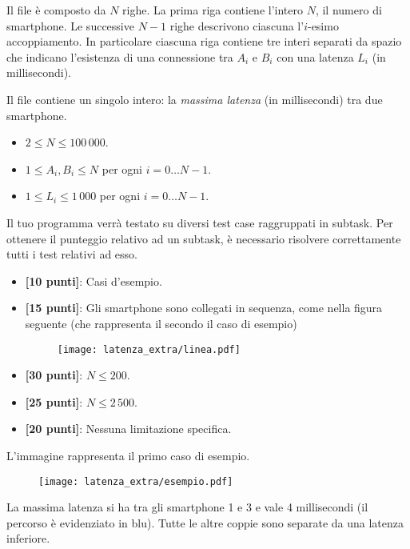 \InputFile
Il file  è composto da $N$ righe. La prima riga contiene l'intero $N$, il numero di smartphone.
Le successive $N - 1$ righe descrivono ciascuna l'$i$-esimo accoppiamento. In particolare ciascuna riga contiene tre interi separati da spazio che indicano l'esistenza di una connessione tra $A_i$ e $B_i$ con una latenza $L_i$ (in millisecondi).

\OutputFile
Il file \outputfile{} contiene un singolo intero: la \emph{massima latenza} (in millisecondi) tra due smartphone.

\Constraints
\begin{itemize}[nolistsep, itemsep=2mm]
    \item $2 \le N \le 100\,000$.
    \item $1 \le A_i, B_i \le N$ per ogni $i=0\ldots N-1$.
    \item $1 \le L_i \le 1\,000$ per ogni $i=0\ldots N-1$.
\end{itemize}

\pagebreak
\Scoring
Il tuo programma verrà testato su diversi test case raggruppati in subtask.
Per ottenere il punteggio relativo ad un subtask, è necessario risolvere
correttamente tutti i test relativi ad esso.

\begin{itemize}[nolistsep,itemsep=2mm]
  \item \textbf{ [10 punti]}: Casi d'esempio.
  \item \textbf{ [15 punti]}: Gli smartphone sono collegati in sequenza, come nella figura seguente (che rappresenta il secondo il caso di esempio)
    \begin{figure}[H]
        \centering\texttt{[image: latenza\_extra/linea.pdf]}
    \end{figure}

  \item \textbf{ [30 punti]}: $N \leq 200$.
  \item \textbf{ [25 punti]}: $N \leq 2\,500$.
  \item \textbf{ [20 punti]}: Nessuna limitazione specifica.
\end{itemize}

\Examples
\begin{example}
%
\end{example}
\begin{example}
%
\end{example}

\Explanation
L'immagine rappresenta il primo caso di esempio.
\begin{figure}[H]
  \centering
    \centering\texttt{[image: latenza\_extra/esempio.pdf]}
\end{figure}
La massima latenza si ha tra gli smartphone 1 e 3 e vale 4 millisecondi (il percorso è evidenziato in blu). Tutte le altre coppie sono separate da una latenza inferiore.
